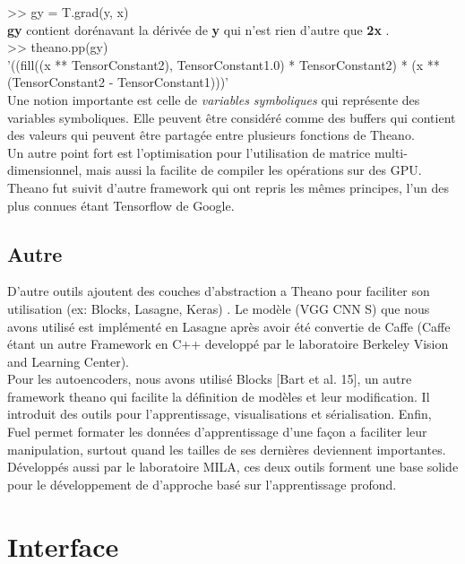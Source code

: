 >> gy = T.grad(y, x)\\

\textbf{gy} contient dorénavant la dérivée de \textbf{y} qui n'est rien d'autre que \textbf{2x} .\\

>> theano.pp(gy)\\
 '((fill((x ** TensorConstant{2}), TensorConstant{1.0}) * TensorConstant{2}) * (x ** (TensorConstant{2} - TensorConstant{1})))'\\
 
Une notion importante est celle de \textit{variables symboliques} qui représente des variables symboliques. Elle peuvent être considéré comme des buffers qui contient des valeurs qui peuvent être partagée entre plusieurs fonctions de Theano.\\

Un autre point fort est l'optimisation pour l'utilisation de matrice multi-dimensionnel, mais aussi la facilite de compiler les opérations sur des GPU.\\

Theano fut suivit d'autre framework qui ont repris les mêmes principes, l'un des plus connues étant Tensorflow de Google.

\subsection{Autre}
D'autre outils ajoutent des couches d'abstraction a Theano pour faciliter son utilisation (ex: Blocks, Lasagne, Keras) .
Le modèle (VGG CNN S) que nous avons utilisé est implémenté en Lasagne après avoir été convertie de Caffe (Caffe étant un autre Framework en C++ developpé par le laboratoire Berkeley Vision and Learning Center).\\

Pour les autoencoders, nous avons utilisé Blocks [Bart et al. 15], un autre framework theano qui facilite la définition de modèles et leur modification. Il introduit des outils pour l'apprentissage, visualisations et sérialisation. Enfin, Fuel permet formater les données d'apprentissage d'une façon a faciliter leur manipulation, surtout quand les tailles de ses dernières deviennent importantes.
Développés aussi par le laboratoire MILA, ces deux outils forment une base solide pour le développement de d’approche basé sur l'apprentissage profond.

\section{Interface}

